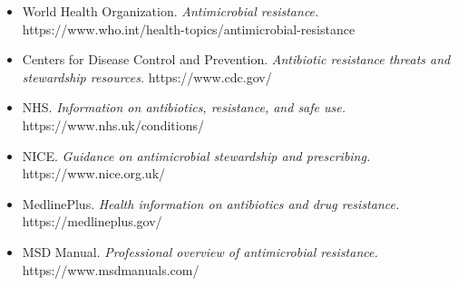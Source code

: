 \begin{itemize}
    \item World Health Organization. \textit{Antimicrobial resistance.} https://www.who.int/health-topics/antimicrobial-resistance
    \item Centers for Disease Control and Prevention. \textit{Antibiotic resistance threats and stewardship resources.} https://www.cdc.gov/
    \item NHS. \textit{Information on antibiotics, resistance, and safe use.} https://www.nhs.uk/conditions/
    \item NICE. \textit{Guidance on antimicrobial stewardship and prescribing.} https://www.nice.org.uk/
    \item MedlinePlus. \textit{Health information on antibiotics and drug resistance.} https://medlineplus.gov/
    \item MSD Manual. \textit{Professional overview of antimicrobial resistance.} https://www.msdmanuals.com/
\end{itemize}
